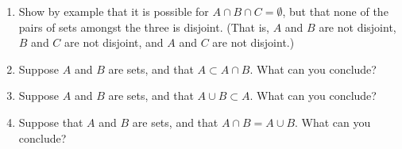 \begin{enumerate}
    \item Show by example that it is possible for $A \cap B \cap C = \emptyset$, but that none of the pairs of sets amongst the three is disjoint. (That is, $A$ and $B$ are not disjoint, $B$ and $C$ are not disjoint, and $A$ and $C$ are not disjoint.)

    \item Suppose $A$ and $B$ are sets, and that $A \subset A \cap B$. What can you conclude?

    \item Suppose $A$ and $B$ are sets, and that $A \cup B \subset A$. What can you conclude?

    \item Suppose that $A$ and $B$ are sets, and that $A \cap B = A \cup B$. What can you conclude?

\end{enumerate}
